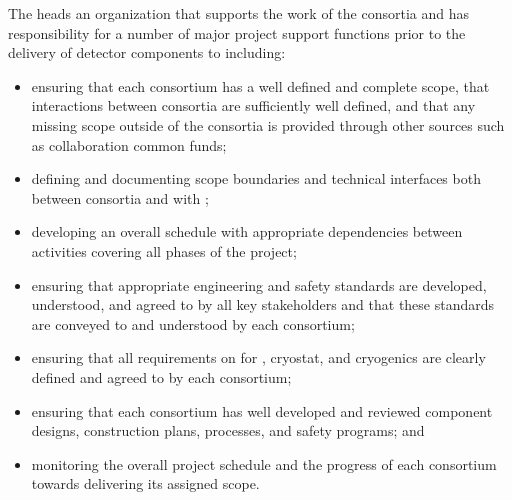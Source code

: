 The  heads an organization that supports the work of 
the consortia and has responsibility for a number of major project 
support functions prior to the delivery of detector components to 
 including:
\begin{itemize}
\item ensuring that each consortium has a well defined and complete
  scope, that interactions between consortia are sufficiently 
  well defined, and that any missing scope outside of the 
  consortia is provided through other sources such as collaboration
  common funds;
\item defining and documenting scope boundaries and technical 
  interfaces both between consortia and with ;  
\item developing an overall schedule with appropriate dependencies
  between activities covering all phases of the project; 
\item ensuring that appropriate engineering and safety standards 
  are developed, understood, and agreed to by all key stakeholders 
  and that these standards are conveyed to and understood by each
  consortium;
\item ensuring that all  requirements on  
  for , cryostat, and cryogenics are clearly defined and 
  agreed to by each consortium;
\item ensuring that each consortium has well developed and reviewed
  component designs, construction plans,  processes, and 
  safety programs; and
\item monitoring the overall project schedule and the progress of 
  each consortium towards delivering its assigned scope. 
\end{itemize}

